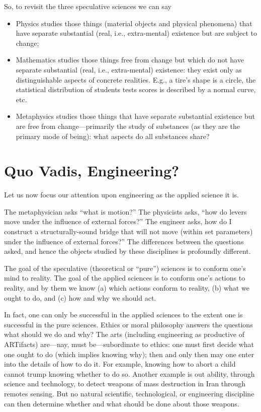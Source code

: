 So, to revisit the three speculative sciences we can say

\begin{itemize}
\item Physics studies those things (material objects and physical phenomena) that have separate substantial (real, i.e., extra-mental) existence but are subject to change;
\item Mathematics studies those things free from change but which do not have separate substantial (real, i.e., extra-mental) existence: they exist only as distinguishable aspects of concrete realities. E.g., a tire’s shape is a circle, the statistical distribution of students tests scores is described by a normal curve, etc.
\item Metaphysics studies those things that have separate substantial existence but are free from change---primarily the study of substances (as they are the primary mode of being): what aspects do all substances share?
\end{itemize}

\section{Quo Vadis, Engineering?}

Let us now focus our attention upon engineering as the applied science it is.

The metaphysician asks ``what is motion?'' The physicists asks, ``how do levers move under the influence of external forces?'' The engineer asks, how do I construct a structurally-sound bridge that will not move (within set parameters) under the influence of external forces?'' The differences between the questions asked, and hence the objects studied by these disciplines is profoundly different.

The goal of the speculative (theoretical or ``pure'') sciences is to conform one’s mind to reality. The goal of the applied sciences is to conform one’s actions to reality, and by them we know (a) which actions conform to reality, (b) what we ought to do, and (c) how and why we should act.

In fact, one can only be successful in the applied sciences to the extent one is successful in the pure sciences. Ethics or moral philosophy answers the questions what should we do and why? The arts (including engineering as productive of ARTifacts) are---nay, must be---subordinate to ethics: one must first decide what one ought to do (which implies knowing why); then and only then may one enter into the details of how to do it. For example, knowing how to abort a child cannot trump knowing whether to do so. Another example is out ability, through science and technology, to detect weapons of mass destruction in Iran through remotes sensing. But no natural scientific, technological, or engineering discipline can then determine whether and what should be done about those weapons.

